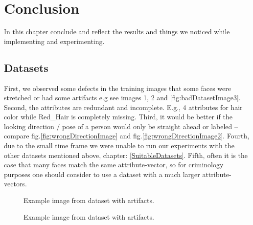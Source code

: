 \documentclass[12pt, a4paper]{article}
\begin{document}
\section{Conclusion}
In this chapter conclude and reflect the results and things we noticed while implementing and experimenting.
\subsection{Datasets}
First, we observed some defects in the training images that some faces were stretched or had some artifacts e.g see images \ref{fig:badDatasetImage}, \ref{fig:badDatasetImage2} and \ref{fig:badDatasetImage3}.
Second, the attributes are redundant and incomplete. E.g., 4 attributes for hair color while Red\_Hair is completely missing.
Third, it would be better if the looking direction / pose of a person would only be straight ahead or labeled -- compare fig.\ref{fig:wrongDirectionImage} and fig.\ref{fig:wrongDirectionImage2}.
Fourth, due to the small time frame we were unable to run our experiments with the other datasets mentioned above, chapter: \ref{SuitableDatasets}.
Fifth, often it is the case that many faces match the same attribute-vector, so for criminology purposes one should consider to use a dataset with a much larger attribute-vectors.
\begin{figure}
    \caption{Example image from dataset with artifacts.}
    \label{fig:badDatasetImage}
\end{figure}
\begin{figure}
    \caption{Example image from dataset with artifacts.}
    \label{fig:badDatasetImage2}
\end{figure}
\end{document}
